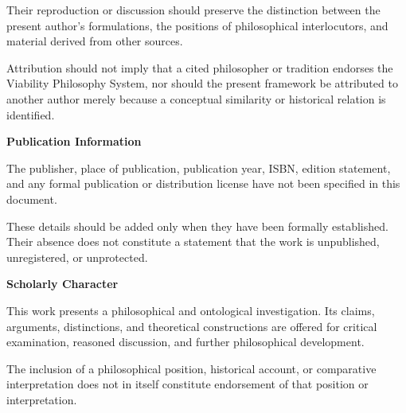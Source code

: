 Their reproduction or discussion should preserve the distinction
between the present author's formulations, the positions of
philosophical interlocutors, and material derived from other
sources.

Attribution should not imply that a cited philosopher or tradition
endorses the Viability Philosophy System, nor should the present
framework be attributed to another author merely because a
conceptual similarity or historical relation is identified.


\vspace{0.9cm}



\noindent
\textbf{Publication Information}

\vspace{0.3cm}

\noindent
The publisher, place of publication, publication year, ISBN,
edition statement, and any formal publication or distribution
license have not been specified in this document.

These details should be added only when they have been formally
established. Their absence does not constitute a statement that
the work is unpublished, unregistered, or unprotected.


\vspace{0.9cm}



\noindent
\textbf{Scholarly Character}

\vspace{0.3cm}

\noindent
This work presents a philosophical and ontological investigation.
Its claims, arguments, distinctions, and theoretical constructions
are offered for critical examination, reasoned discussion, and
further philosophical development.

The inclusion of a philosophical position, historical account,
or comparative interpretation does not in itself constitute
endorsement of that position or interpretation.


\vfill



